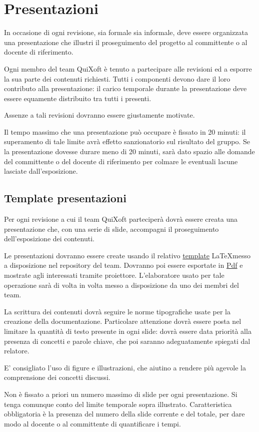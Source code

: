 \documentclass[11pt,a4paper]{article}
\begin{document}
\section{Presentazioni}
In occasione di ogni revisione, sia formale sia informale, deve essere organizzata una presentazione che illustri il proseguimento del progetto al committente o al docente di riferimento.

Ogni membro del team QuiXoft è tenuto a partecipare alle revisioni ed a esporre la sua parte dei contenuti richiesti.
Tutti i componenti devono dare il loro contributo alla presentazione: il carico temporale durante la presentazione deve essere equamente distribuito tra tutti i presenti.

Assenze a tali revisioni dovranno essere giustamente motivate.

Il tempo massimo che una presentazione può occupare è fissato in 20 minuti: il superamento di tale limite avrà effetto sanzionatorio sul risultato del gruppo.
Se la presentazione dovesse durare meno di 20 minuti, sarà dato spazio alle domande del committente o del docente di riferimento per colmare le eventuali lacune lasciate dall'esposizione.
\subsection{Template presentazioni}
Per ogni revisione a cui il team QuiXoft parteciperà dovrà essere creata una presentazione che, con una serie di slide, accompagni il proseguimento dell'esposizione dei contenuti.

Le presentazioni dovranno essere create usando il relativo \underline{template} \LaTeX \space messo a disposizione nel repository del team.
Dovranno poi essere esportate in \underline{Pdf} e mostrate agli interessati tramite proiettore.
L'elaboratore usato per tale operazione sarà di volta in volta messo a disposizione da uno dei membri del team.

La scrittura dei contenuti dovrà seguire le norme tipografiche usate per la creazione della documentazione.
Particolare attenzione dovrà essere posta nel limitare la quantità di testo presente in ogni slide: dovrà essere data priorità alla presenza di concetti e parole chiave, che poi saranno adeguatamente spiegati dal relatore.

E' consigliato l'uso di figure e illustrazioni, che aiutino a rendere più agevole la comprensione dei concetti discussi.

Non è fissato a priori un numero massimo di slide per ogni presentazione. Si tenga comunque conto del limite temporale sopra illustrato.
Caratteristica obbligatoria è la presenza del numero della slide corrente e del totale, per dare modo al docente o al committente di quantificare i tempi.
\end{document}
